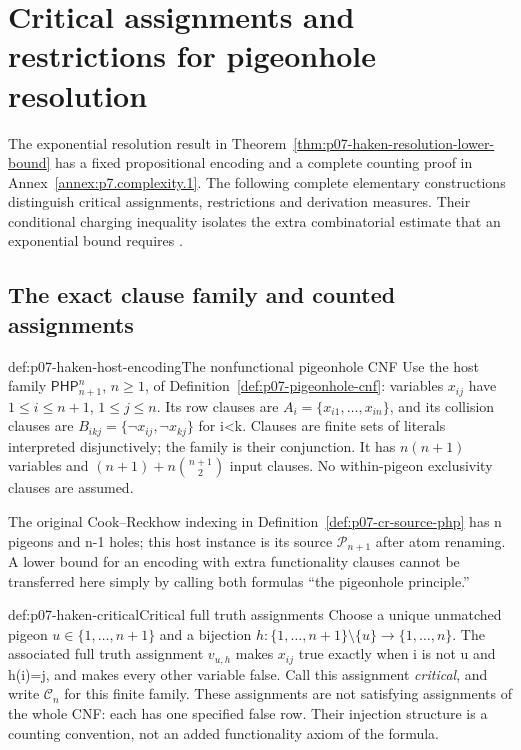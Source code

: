 \section{Critical assignments and restrictions for pigeonhole resolution}
\label{sec:p07-haken-critical-restrictions}

The exponential resolution result in
Theorem~\ref{thm:p07-haken-resolution-lower-bound} has a fixed
propositional encoding and a complete counting proof in
Annex~\ref{annex:p7.complexity.1}. The following complete elementary
constructions distinguish critical assignments, restrictions and
derivation measures. Their conditional charging inequality isolates
the extra combinatorial estimate that an exponential bound requires
\cite{Haken1985,CookReckhow1979}.

\subsection{The exact clause family and counted assignments}

\begin{hbconvention}{def:p07-haken-host-encoding}{The nonfunctional pigeonhole CNF}
Use the host family \(\mathsf{PHP}^{n}_{n+1}\), \(n\geq1\),
of Definition~\ref{def:p07-pigeonhole-cnf}: variables
\(x_{ij}\) have \(1\leq i\leq n+1\), \(1\leq j\leq n\).
Its row clauses are \(A_i=\{x_{i1},\ldots,x_{in}\}\), and
its collision clauses are
\(B_{ikj}=\{\neg x_{ij},\neg x_{kj}\}\) for i<k.
Clauses are finite sets of literals interpreted disjunctively;
the family is their conjunction. It has
\(n(n+1)\) variables and
\((n+1)+n\binom{n+1}{2}\) input clauses.
No within-pigeon exclusivity clauses are assumed.

The original Cook--Reckhow indexing in
Definition~\ref{def:p07-cr-source-php} has n pigeons and n-1
holes; this host instance is its source \(\mathcal P_{n+1}\)
after atom renaming. A lower bound for an encoding with extra
functionality clauses cannot be transferred here simply by
calling both formulas ``the pigeonhole principle.''
\end{hbconvention}

\begin{hbdefinition}{def:p07-haken-critical}{Critical full truth assignments}
Choose a unique unmatched pigeon \(u\in\{1,\ldots,n+1\}\)
and a bijection \(h:\{1,\ldots,n+1\}\setminus\{u\}
\to\{1,\ldots,n\}\). The associated full truth assignment
\(v_{u,h}\) makes \(x_{ij}\) true exactly when i is not u
and h(i)=j, and makes every other variable false.
Call this assignment \emph{critical}, and write \(\mathcal C_n\)
for this finite family. These assignments are not satisfying
assignments of the whole CNF: each has one specified false row.
Their injection structure is a counting convention, not an added
functionality axiom of the formula.
\end{hbdefinition}

